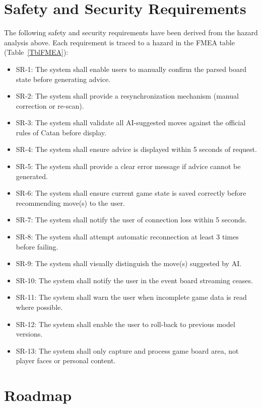 \documentclass{article}
\begin{document}
\section{Safety and Security Requirements}\label{sec:safety-and-security-requirements}


The following safety and security requirements have been derived from the hazard analysis above.
Each requirement is traced to a hazard in the FMEA table (Table~\ref{TblFMEA}):

\begin{itemize}
    \item SR-1: The system shall enable users to manually confirm the parsed board state before generating advice.
    \item SR-2: The system shall provide a resynchronization mechanism (manual correction or re-scan).
    \item SR-3: The system shall validate all AI-suggested moves against the official rules of Catan before display.
    \item SR-4: The system shall ensure advice is displayed within 5 seconds of request.
    \item SR-5: The system shall provide a clear error message if advice cannot be generated.
    \item SR-6: The system shall ensure current game state is saved correctly before recommending move(s) to the user.
    \item SR-7: The system shall notify the user of connection loss within 5 seconds.
    \item SR-8: The system shall attempt automatic reconnection at least 3 times before failing.
    \item SR-9: The system shall visually distinguish the move(s) suggested by AI.
    \item SR-10: The system shall notify the user in the event board streaming ceases.
    \item SR-11: The system shall warn the user when incomplete game data is read where possible.
    \item SR-12: The system shall enable the user to roll-back to previous model versions.
    \item SR-13: The system shall only capture and process game board area, not player faces or personal content.
\end{itemize}


\section{Roadmap}\label{sec:roadmap}
\end{document}
